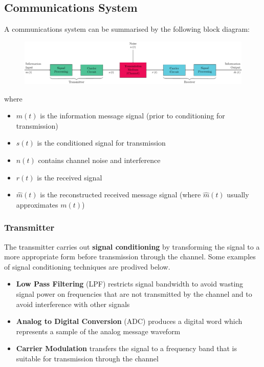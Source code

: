 \documentclass{article}
\begin{document}
\subsection{Communications System}
A communications system can be summarised by the following block diagram:
\begin{figure}[H]
    \centering
    \includegraphics[width=\linewidth]{figures/communications_system.pdf}
\end{figure}
where
\begin{itemize}
    \item \(m\left( t \right)\) is the information message signal (prior to conditioning for transmission)
    \item \(s\left( t \right)\) is the conditioned signal for transmission
    \item \(n\left( t \right)\) contains channel noise and interference
    \item \(r\left( t \right)\) is the received signal
    \item \(\hat{m}\left( t \right)\) is the reconstructed received message signal (where \(\hat{m}\left( t \right)\) usually approximates \(m\left( t \right)\))
\end{itemize}
\subsubsection{Transmitter}
The transmitter carries out \textbf{signal conditioning} by transforming the signal to a more appropriate form before transmission through the channel.
Some examples of signal conditioning techniques are prodived below.
\begin{itemize}
    \item \textbf{Low Pass Filtering} (LPF) restricts signal bandwidth to avoid wasting signal power on frequencies that are not transmitted by the channel and to avoid interference with other signals
    \item \textbf{Analog to Digital Conversion} (ADC) produces a digital word which represents a sample of the analog message waveform
    \item \textbf{Carrier Modulation} transfers the signal to a frequency band that is suitable for transmission through the channel
\end{itemize}
\end{document}

